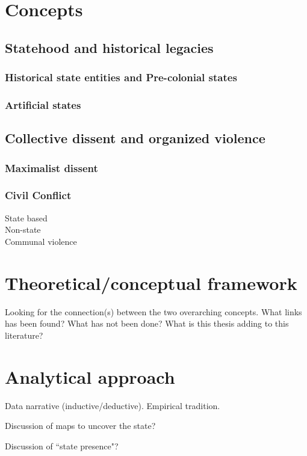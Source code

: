 \documentclass[12pt]{article}
\begin{document}
\section{Concepts} \label{Concepts}

\subsection{Statehood and historical legacies} \label{Statehood and historical legacies}

\subsubsection{Historical state entities and Pre-colonial states} \label{Historical state entities and Pre-colonial states}

\subsubsection{Artificial states} \label{Artificial states}

\subsection{Collective dissent and organized violence} \label{Collective dissent and organized violence}

\subsubsection{Maximalist dissent} \label{Maximalist dissent}

\subsubsection{Civil Conflict} \label{Civil Conflict}

State based \\

Non-state \\ 

Communal violence \\

\section{Theoretical/conceptual framework} \label{Theoretical/conceptual framework}

Looking for the connection(s) between the two overarching concepts. What links
has been found? What has not been done? What is this thesis adding to this
literature?

\section{Analytical approach} \label{Analytical approach}

Data narrative (inductive/deductive). Empirical tradition.

Discussion of maps to uncover the state?

Discussion of ``state presence"?

\pagebreak



\end{document}
